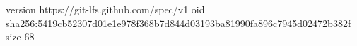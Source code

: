 version https://git-lfs.github.com/spec/v1
oid sha256:5419cb52307d01e1e978f368b7d844d03193ba81990fa896c7945d02472b382f
size 68
